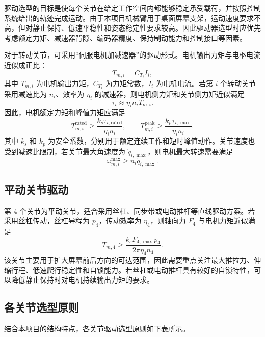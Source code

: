 \documentclass[12pt,a4paper,UTF8]{article}
\begin{document}
驱动选型的目标是使每个关节在给定工作空间内都能够稳定承受载荷，并按照控制系统给出的轨迹完成运动。由于本项目机械臂用于桌面屏幕支架，运动速度要求不高，但对静止保持、低速平稳性和姿态稳定性要求较高。因此驱动器选型时应优先考虑额定力矩、减速器背隙、编码器精度、保持制动能力和控制接口等因素。

对于转动关节，可采用“伺服电机加减速器”的驱动形式。电机输出力矩与电枢电流近似成正比：
\[
T_{m,i}=C_{T_i}I_i ,
\]
其中 $T_{m,i}$ 为电机输出力矩，$C_{T_i}$ 为力矩常数，$I_i$ 为电机电流。若第 $i$ 个转动关节采用减速比为 $n_i$、效率为 $\eta_i$ 的减速器，则电机侧力矩和关节侧力矩近似满足
\[
\tau_i \approx \eta_i n_i T_{m,i}.
\]
因此，电机额定力矩和峰值力矩应满足
\[
T_{m,i}^{\mathrm{rated}}
\geq
\frac{k_s \tau_{i,\mathrm{rated}}}{\eta_i n_i},
\qquad
T_{m,i}^{\mathrm{peak}}
\geq
\frac{k_p \tau_{i,\max}}{\eta_i n_i}.
\]
其中 $k_s$ 和 $k_p$ 为安全系数，分别用于额定连续工作和短时峰值动作。关节速度也受到减速比限制，若关节最大角速度为 $\dot q_{i,\max}$，则电机最大转速需要满足
\[
\omega_{m,i}^{\max}\geq n_i\dot q_{i,\max}.
\]

\subsection{平动关节驱动}

第 4 个关节为平动关节，适合采用丝杠、同步带或电动推杆等直线驱动方案。若采用丝杠传动，丝杠导程为 $p_4$，传动效率为 $\eta_4$，则轴向力 $F_4$ 与电机力矩近似满足
\[
T_{m,4}
\geq
\frac{k_s F_{4,\max}p_4}{2\pi \eta_4 n_4}.
\]
该关节主要用于扩大屏幕前后方向的可达范围，因此需要重点关注最大推拉力、伸缩行程、低速爬行稳定性和自锁能力。若丝杠或电动推杆具有较好的自锁特性，可以降低静止保持时对电机持续输出力矩的要求。

\subsection{各关节选型原则}

结合本项目的结构特点，各关节驱动选型原则如下表所示。
\end{document}

